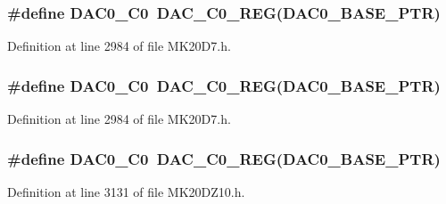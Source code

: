 \subsubsection[{\texorpdfstring{D\+A\+C0\+\_\+\+C0}{DAC0_C0}}]{\setlength{\rightskip}{0pt plus 5cm}\#define D\+A\+C0\+\_\+\+C0~{\bf D\+A\+C\+\_\+\+C0\+\_\+\+R\+EG}({\bf D\+A\+C0\+\_\+\+B\+A\+S\+E\+\_\+\+P\+TR})}\hypertarget{group___d_a_c___register___accessor___macros_ga00e22b8e72b6f59cbb7c46c47c71930c}{}\label{group___d_a_c___register___accessor___macros_ga00e22b8e72b6f59cbb7c46c47c71930c}


Definition at line 2984 of file M\+K20\+D7.\+h.

\subsubsection[{\texorpdfstring{D\+A\+C0\+\_\+\+C0}{DAC0_C0}}]{\setlength{\rightskip}{0pt plus 5cm}\#define D\+A\+C0\+\_\+\+C0~{\bf D\+A\+C\+\_\+\+C0\+\_\+\+R\+EG}({\bf D\+A\+C0\+\_\+\+B\+A\+S\+E\+\_\+\+P\+TR})}\hypertarget{group___d_a_c___register___accessor___macros_ga00e22b8e72b6f59cbb7c46c47c71930c}{}\label{group___d_a_c___register___accessor___macros_ga00e22b8e72b6f59cbb7c46c47c71930c}


Definition at line 2984 of file M\+K20\+D7.\+h.

\subsubsection[{\texorpdfstring{D\+A\+C0\+\_\+\+C0}{DAC0_C0}}]{\setlength{\rightskip}{0pt plus 5cm}\#define D\+A\+C0\+\_\+\+C0~{\bf D\+A\+C\+\_\+\+C0\+\_\+\+R\+EG}({\bf D\+A\+C0\+\_\+\+B\+A\+S\+E\+\_\+\+P\+TR})}\hypertarget{group___d_a_c___register___accessor___macros_ga00e22b8e72b6f59cbb7c46c47c71930c}{}\label{group___d_a_c___register___accessor___macros_ga00e22b8e72b6f59cbb7c46c47c71930c}


Definition at line 3131 of file M\+K20\+D\+Z10.\+h.

